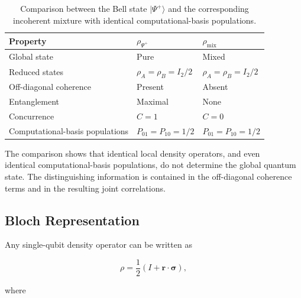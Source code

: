 \begin{table}[htbp]
\centering
\caption{Comparison between the Bell state \(|\Psi^+\rangle\) and the
corresponding incoherent mixture with identical computational-basis populations.}
\label{tab:bell_vs_incoherent_mixture}
\begin{tabular}{p{6.4cm}p{4.5cm}p{3cm}}
\hline
Property
&
\(\rho_{\Psi^+}\)
&
\(\rho_{\mathrm{mix}}\)
\\
\hline
Global state
&
Pure
&
Mixed
\\

Reduced states
&
\(\rho_A=\rho_B=I_2/2\)
&
\(\rho_A=\rho_B=I_2/2\)
\\

Off-diagonal coherence
&
Present
&
Absent
\\

Entanglement
&
Maximal
&
None
\\

Concurrence
&
\(C=1\)
&
\(C=0\)
\\

Computational-basis populations
&
\(P_{01}=P_{10}=1/2\)
&
\(P_{01}=P_{10}=1/2\)
\\

\hline
\end{tabular}
\end{table}

The comparison shows that identical local density operators, and even \\identical
computational-basis populations, do not determine the global quantum state. The
distinguishing information is contained in the off-diagonal coherence terms and
in the resulting joint correlations.


\subsection{Bloch Representation}
\label{subsec:bloch_representation}

Any single-qubit density operator can be written as

\begin{equation}
\rho
=
\frac{1}{2}
\left(
I+\mathbf{r}\cdot\boldsymbol{\sigma}
\right),
\label{eq:bloch_density_representation}
\end{equation}

where

